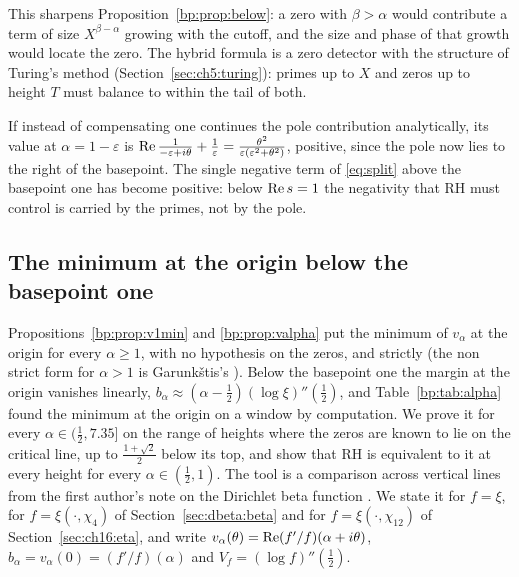 This sharpens Proposition~\ref{bp:prop:below}: a zero with $\beta>\alpha$ would contribute a term of size $X^{\beta-\alpha}$ growing with the cutoff, and the size and phase of that growth would locate the zero. The hybrid formula is a zero detector with the structure of Turing's method (Section~\ref{sec:ch5:turing}): primes up to $X$ and zeros up to height $T$ must balance to within the tail of both.

If instead of compensating one continues the pole contribution analytically, its value at $\alpha=1-\varepsilon$ is $\operatorname{Re}\frac1{-\varepsilon+i\theta}+\frac1\varepsilon=\frac{\theta^2}{\varepsilon(\varepsilon^2+\theta^2)}$, positive, since the pole now lies to the right of the basepoint. The single negative term of \eqref{eq:split} above the basepoint one has become positive: below $\operatorname{Re} s=1$ the negativity that RH must control is carried by the primes, not by the pole.

\subsection{The minimum at the origin below the basepoint one}\label{sec:dbeta:comp}

Propositions~\ref{bp:prop:v1min} and \ref{bp:prop:valpha} put the minimum of $v_\alpha$ at the origin for every $\alpha\ge1$, with no hypothesis on the zeros, and strictly (the non strict form for $\alpha>1$ is Garunk\v{s}tis's \cite{Garunkstis02}). Below the basepoint one the margin at the origin vanishes linearly, $b_\alpha\approx(\alpha-\frac12)(\log\xi)''(\frac12)$, and Table~\ref{bp:tab:alpha} found the minimum at the origin on a window by computation. We prove it for every $\alpha\in(\frac12,7.35]$ on the range of heights where the zeros are known to lie on the critical line, up to $\frac{1+\sqrt2}2$ below its top, and show that RH is equivalent to it at every height for every $\alpha\in(\frac12,1)$. The tool is a comparison across vertical lines from the first author's note on the Dirichlet beta function \cite{P26beta}. We state it for $f=\xi$, for $f=\xi(\cdot,\chi_4)$ of Section~\ref{sec:dbeta:beta} and for $f=\xi(\cdot,\chi_{12})$ of Section~\ref{sec:ch16:eta}, and write $v_\alpha(\theta)=\operatorname{Re}(f'/f)(\alpha+i\theta)$, $b_\alpha=v_\alpha(0)=(f'/f)(\alpha)$ and $V_f=(\log f)''(\frac12)$.

